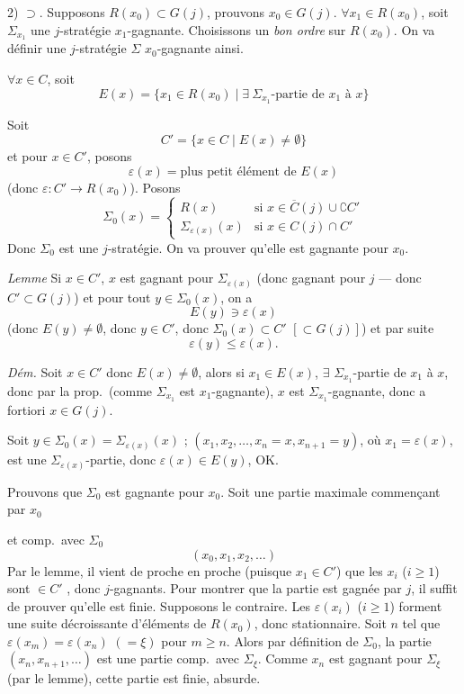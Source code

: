 \documentclass[11pt,a4paper]{article}
\begin{document}
2) $\supset$. Supposons $R(x_0) \subset G(j)$, prouvons $x_0 \in G(j)$.
$\forall x_1 \in R(x_0)$, soit $\Sigma_{x_1}$ une $j$-stratégie
$x_1$-gagnante. Choisissons un \emph{bon ordre} sur $R(x_0)$. On va définir
une $j$-stratégie $\Sigma$ $x_0$-gagnante ainsi.

$\forall x \in C$, soit
\[
E(x) = \{ x_1 \in R(x_0) \mid \exists\ \Sigma_{x_1}\text{-partie de } x_1 \text{ à } x \}
\]

Soit
\[
C' = \{ x \in C \mid E(x) \neq \emptyset \}
\]
et pour $x \in C'$, posons
\[
\varepsilon(x) = \text{plus petit élément de } E(x)
\]
(donc $\varepsilon : C' \to R(x_0)$). Posons
\[
\Sigma_0(x) =
\begin{cases}
R(x) & \text{si } x \in \overline{C}(j) \cup \complement C' \\
\Sigma_{\varepsilon(x)}(x) & \text{si } x \in C(j) \cap C'
\end{cases}
\]
Donc $\Sigma_0$ est une $j$-stratégie. On va prouver qu'elle est gagnante pour
$x_0$.

\emph{Lemme}  Si $x \in C'$, $x$ est gagnant pour
$\Sigma_{\varepsilon(x)}$ (donc gagnant pour $j$ — donc $C' \subset G(j)$) et
 pour tout $y \in \Sigma_0(x)$, on a
\[
E(y) \ni \varepsilon(x)
\]
(donc $E(y) \neq \emptyset$, donc $y \in C'$, donc $\Sigma_0(x) \subset C'$
$[\subset G(j)]$) et par suite
\[
\varepsilon(y) \leq \varepsilon(x).
\]

\emph{Dém.} Soit $x \in C'$ donc $E(x) \neq \emptyset$, alors si
$x_1 \in E(x)$, $\exists$  $\Sigma_{x_1}$-partie de $x_1$ à $x$,
donc par la prop.\ (comme $\Sigma_{x_1}$ est $x_1$-gagnante), $x$ est
$\Sigma_{x_1}$-gagnante, donc a fortiori $x \in G(j)$.

Soit $y \in \Sigma_0(x) = \Sigma_{\varepsilon(x)}(x)$ ;
$(x_1, x_2, \dots, x_n = x, x_{n+1} = y)$, où $x_1 = \varepsilon(x)$, est une
$\Sigma_{\varepsilon(x)}$-partie, donc \struck{\ill{}}
$\varepsilon(x) \in E(y)$, OK.

Prouvons que $\Sigma_0$ est gagnante pour $x_0$. Soit une partie maximale
commençant par $x_0$

et comp.\ avec $\Sigma_0$
\[
(x_0, x_1, x_2, \dots)
\]
Par le lemme, il vient de proche en proche 
(puisque $x_1 \in C'$) que  les $x_i$ ($i \geq 1$)
sont $\in C'$ \struck{\ill{}}, donc $j$-gagnants. Pour montrer que la partie
est gagnée par $j$, il suffit de prouver qu'elle est finie. 
Supposons le contraire. Les $\varepsilon(x_i)$ ($i \geq 1$) forment une suite
décroissante d'éléments de $R(x_0)$, donc stationnaire. Soit $n$ tel que
$\varepsilon(x_m) = \varepsilon(x_n)$ $(= \xi)$ pour $m \geq n$. Alors par
définition de $\Sigma_0$, la partie $(x_n, x_{n+1}, \dots)$ est une partie
comp.\ avec $\Sigma_\xi$. Comme $x_n$ est gagnant pour $\Sigma_\xi$ (par le
lemme), cette partie est finie, absurde.
\end{document}
